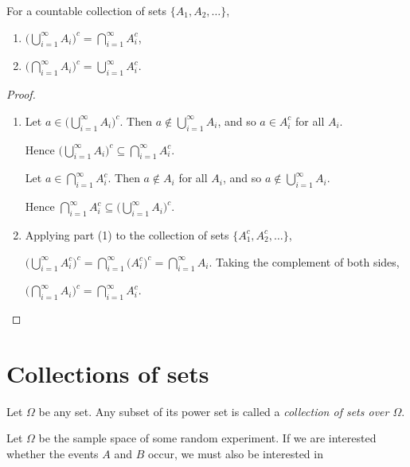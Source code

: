 \break %

\begin{theorem}
For a countable collection of sets $\{A_1,A_2,\ldots\}$,
\begin{enumerate}
\item $\big(\bigcup_{i=1}^{\infty} A_i\big)^c = \bigcap_{i=1}^{\infty} A_i^c$,
\item $\big(\bigcap_{i=1}^{\infty} A_i\big)^c = \bigcup_{i=1}^{\infty} A_i^c$.
\end{enumerate}
\end{theorem}

\begin{proof}
\begin{enumerate}
\item %
Let $a\in\big(\bigcup_{i=1}^\infty A_i\big)^c$. Then $a\notin\bigcup_{i=1}^\infty A_i$, and so $a\in A_i^c$ for all $A_i$.\par
Hence $\big(\bigcup_{i=1}^\infty A_i\big)^c \subseteq \bigcap_{i=1}^\infty A_i^c$.\par
Let $a\in\bigcap_{i=1}^\infty A_i^c$. Then $a\notin A_i$ for all $A_i$, and so $a\notin\bigcup_{i=1}^\infty A_i$.\par 
Hence $\bigcap_{i=1}^\infty A_i^c \subseteq \big(\bigcup_{i=1}^\infty A_i\big)^c$.
\item %
Applying part (1) to the collection of sets $\{A_1^c,A_2^c,\ldots\}$,\par
$\big(\bigcup_{i=1}^\infty A_i^c\big)^c = \bigcap_{i=1}^\infty \big(A_i^c\big)^c = \bigcap_{i=1}^\infty A_i$.
Taking the complement of both sides,\par 
$\big(\bigcap_{i=1}^\infty A_i\big)^c = \bigcap_{i=1}^\infty A_i^c$.
\end{enumerate}
\end{proof}


\section{Collections of sets}
\begin{definition}
Let $\Omega$ be any set. Any subset of its power set is called a \emph{collection of sets over $\Omega$}. 
\end{definition}

Let $\Omega$ be the sample space of some random experiment. 
If we are interested whether the events $A$ and $B$ occur, we must also be interested in

